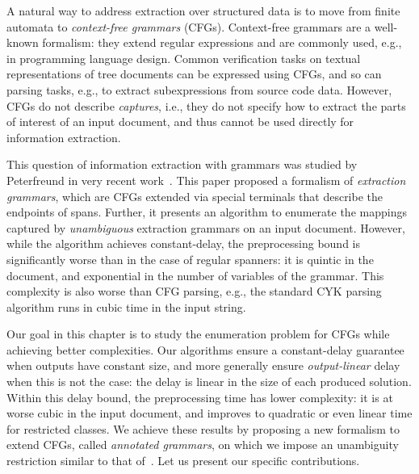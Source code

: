 
A natural way to address extraction over structured data is to move from finite automata to \emph{context-free grammars}
(CFGs). Context-free grammars are a well-known formalism: they extend regular
expressions and are commonly used, e.g., in programming language
design. Common verification tasks on textual representations of tree
documents can be expressed using CFGs, and so can parsing tasks, e.g.,
to extract subexpressions from source code data. However, CFGs do not
describe \emph{captures}, i.e., they do not specify how to extract the
parts of interest of an input document, and thus cannot be used
directly for information extraction.

%
%

This question of information extraction with grammars was studied by Peterfreund in very recent work~\cite{Peterfreund21}. This paper proposed a formalism of \emph{extraction grammars}, which are CFGs extended via special terminals that describe the endpoints of spans.
Further, it presents an algorithm to enumerate the mappings captured by
\emph{unambiguous} extraction grammars on an input document.
However, while the algorithm achieves constant-delay, the preprocessing bound is significantly worse than in the case of regular spanners: it is quintic in the document, and exponential in the number of variables of the grammar. This complexity is also worse than CFG parsing, e.g., the standard CYK parsing algorithm runs in cubic time in the input string.

%
%
%

Our goal in this chapter is to study the enumeration problem for CFGs while
achieving better complexities. Our algorithms ensure a constant-delay
guarantee when outputs have constant size, and more generally ensure
\emph{output-linear} delay when this is not the case: the delay is linear in the
size of each produced solution. Within this delay bound, the preprocessing
time has lower complexity: it is at worse cubic in the
input document, and improves to quadratic or even linear time for restricted
classes. We achieve these results by proposing a new formalism to extend CFGs, called
\emph{annotated grammars}, on which we impose an unambiguity restriction similar
to that of~\cite{Peterfreund21}. Let us present our specific contributions.

